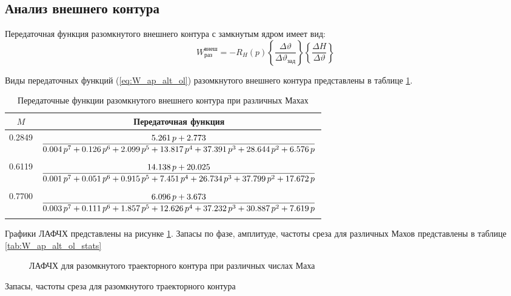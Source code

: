 \subsection{Анализ внешнего контура}
Передаточная функция разомкнутого внешнего контура с замкнутым ядром имеет вид:
\begin{equation}
    W_{раз}^{внеш} = -R_H(p) \left\{ \frac{\Delta \vartheta}{\Delta \vartheta_{зад}} \right\} \left\{ \frac{\Delta H }{\Delta \vartheta} \right\} 
    \label{eq:W_ap_alt_ol}
\end{equation}

Виды передаточных функций (\ref{eq:W_ap_alt_ol}) разомкнутого внешнего контура представлены в таблице \ref{tab:W_ap_alt_ol}.

\begin{table}[H]
    \centering
    \caption{Передаточные функции разомкнутого внешнего контура при различных Махах}
    \label{tab:W_ap_alt_ol}
    \begin{tabular}{|c|c|}
        \hline
    $M$ & Передаточная функция\\ 
    \hline
    0.2849 & $\displaystyle \frac{5.261\,p+2.773}{0.004\,p^7+0.126\,p^6+2.099\,p^5+13.817\,p^4+37.391\,p^3+28.644\,p^2+6.576\,p}\addstrut{3em}$\\ 
    \hline
    0.6119 & $\displaystyle \frac{14.138\,p+20.025}{0.001\,p^7+0.051\,p^6+0.915\,p^5+7.451\,p^4+26.734\,p^3+37.799\,p^2+17.672\,p}\addstrut{3em}$\\
    \hline
    0.7700 & $\displaystyle \frac{6.096\,p+3.673}{0.003\,p^7+0.111\,p^6+1.857\,p^5+12.626\,p^4+37.232\,p^3+30.887\,p^2+7.619\,p}\addstrut{3em}$ \\
    \hline
    \end{tabular}
\end{table}

Графики ЛАФЧХ представлены на рисунке \ref{fig:W_ap_alt_ol}. Запасы по фазе,
амплитуде, частоты среза для различных Махов представлены в таблице
\ref{tab:W_ap_alt_ol_stats}

\begin{figure}[H]
    \centering
    
    \caption{ЛАФЧХ для разомкнутого траекторного контура при различных числах Маха}
    \label{fig:W_ap_alt_ol}
\end{figure}

\begin{table}[H]
    \centering
    \caption{Запасы, частоты среза для разомкнутого траекторного контура}
    \label{tab:W_ap_alt_ol_stats}
    
\end{table}

